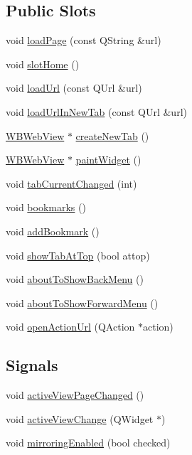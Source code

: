 \subsection*{Public Slots}
\begin{DoxyCompactItemize}
\item 
void \hyperlink{class_w_b_browser_window_a78dc4fc8da7fdc428adfc652823fe67a}{load\-Page} (const Q\-String \&url)
\item 
void \hyperlink{class_w_b_browser_window_a9ba2fa09219bcac87ce5f71709e1011d}{slot\-Home} ()
\item 
void \hyperlink{class_w_b_browser_window_af1feb1efb3072427b2bf17c16d975bd7}{load\-Url} (const Q\-Url \&url)
\item 
void \hyperlink{class_w_b_browser_window_af69e6d75a7cab843ebf8fc1bbdce0e89}{load\-Url\-In\-New\-Tab} (const Q\-Url \&url)
\item 
\hyperlink{class_w_b_web_view}{W\-B\-Web\-View} $\ast$ \hyperlink{class_w_b_browser_window_a3a8fe2814d702b7f35a096cff714cf54}{create\-New\-Tab} ()
\item 
\hyperlink{class_w_b_web_view}{W\-B\-Web\-View} $\ast$ \hyperlink{class_w_b_browser_window_a02de9f2930007bc77f09b20211299c8f}{paint\-Widget} ()
\item 
void \hyperlink{class_w_b_browser_window_a4326e260cf46c177f382007fd7c0a86a}{tab\-Current\-Changed} (int)
\item 
void \hyperlink{class_w_b_browser_window_aec1e4b601203eb8846fd4591e6d1d0ec}{bookmarks} ()
\item 
void \hyperlink{class_w_b_browser_window_a55db99c0327f5077fb0188f77224734a}{add\-Bookmark} ()
\item 
void \hyperlink{class_w_b_browser_window_a16432ec6b00aac8ccd169919041cd8ae}{show\-Tab\-At\-Top} (bool attop)
\item 
void \hyperlink{class_w_b_browser_window_a432d722600afccfb7ee5e9f1e24ba6d0}{about\-To\-Show\-Back\-Menu} ()
\item 
void \hyperlink{class_w_b_browser_window_a9dac1b8eb4ef7e6412d0aedce9ea93de}{about\-To\-Show\-Forward\-Menu} ()
\item 
void \hyperlink{class_w_b_browser_window_ad2116267ebf4a96448b816b9e3369471}{open\-Action\-Url} (Q\-Action $\ast$action)
\end{DoxyCompactItemize}
\subsection*{Signals}
\begin{DoxyCompactItemize}
\item 
void \hyperlink{class_w_b_browser_window_ae814f6836640eeeb8ea7c366472e8dbc}{active\-View\-Page\-Changed} ()
\item 
void \hyperlink{class_w_b_browser_window_ae790506abeb82ba80b904e28e76bc3a3}{active\-View\-Change} (Q\-Widget $\ast$)
\item 
void \hyperlink{class_w_b_browser_window_a39f92481f4c69b93df8ab8f340286ce6}{mirroring\-Enabled} (bool checked)
\end{DoxyCompactItemize}
